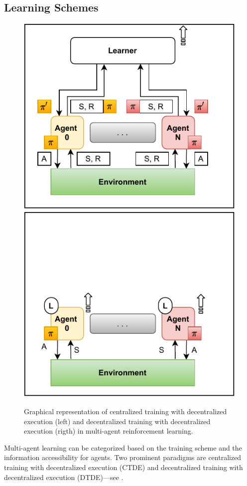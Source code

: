 \documentclass[sigconf]{acmart}
\begin{document}
\subsection{Learning Schemes}
\begin{figure}
  \centering
  \includegraphics[width=0.49\linewidth]{figures/learning-scheme-ctde.pdf}
  \includegraphics[width=0.49\linewidth]{figures/learning-scheme-dtde.pdf}
  \caption{Graphical representation of centralized training with decentralized execution (left) and decentralized training with decentralized execution (rigth) in multi-agent reinforcement learning.}
  \label{fig:learning_paradigms}
\end{figure}
Multi-agent learning can be categorized based on the training scheme and the information accessibility for agents. 
Two prominent paradigms are centralized training with decentralized execution (CTDE) and decentralized training with decentralized execution (DTDE)---see .
\end{document}
